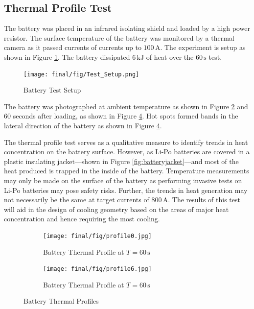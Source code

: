 \documentclass[11pt]{article}
\numberwithin{equation}{subsection} %
\newcommand{\unit}[1]{\ensuremath{\, \mathrm{#1}}}             %
\begin{document}
\subsection{Thermal Profile Test}\label{profile-test}
The battery was placed in an infrared isolating shield and loaded by a high power resistor. The surface temperature of the battery was monitored by a thermal camera as it passed currents of currents up to $100\unit{A}.$ The experiment is setup as shown in Figure \ref{fig:Battery Test Setup}. The battery dissipated $6\unit{kJ}$ of heat over the $60\unit{s}$ test.

\begin{figure}[!htb]
 \centering
	\texttt{[image: final/fig/Test\_Setup.png]}
    \caption{Battery Test Setup}
    \label{fig:Battery Test Setup}
\end{figure}

The battery was photographed at ambient temperature as shown in Figure \ref{fig:Battery Thermal Profile 0} and $60$ seconds after loading, as shown in Figure \ref{fig:Battery Thermal Profile 6}. Hot spots formed bands in the lateral direction of the battery as shown in Figure \ref{fig:Battery Thermal Profile 6}.

The thermal profile test serves as a qualitative measure to identify trends in heat concentration on the battery surface. However, as Li-Po batteries are covered in a plastic insulating jacket---shown in Figure \ref{fig:batteryjacket}---and most of the heat produced is trapped in the inside of the battery. Temperature measurements may only be made on the surface of the battery as performing invasive tests on Li-Po batteries may pose safety risks. Further, the trends in heat generation may not necessarily be the same at target currents of $800\unit{A}$. The results of this test will aid in the design of cooling geometry based on the areas of major heat concentration and hence requiring the most cooling.
 
\begin{figure}[!htb]
     \centering
     \begin{subfigure}[b]{0.49\textwidth}
         \centering
         \texttt{[image: final/fig/profile0.jpg]}
         \caption{Battery Thermal Profile at $T=60\unit{s}$}
         \label{fig:Battery Thermal Profile 0}
     \end{subfigure}
     \hfill
     \begin{subfigure}[b]{0.49\textwidth}
         \centering
	     \texttt{[image: final/fig/profile6.jpg]}
         \caption{Battery Thermal Profile at $T=60\unit{s}$}
         \label{fig:Battery Thermal Profile 6}
     \end{subfigure}
     \caption{Battery Thermal Profiles}
\end{figure}
\end{document}
